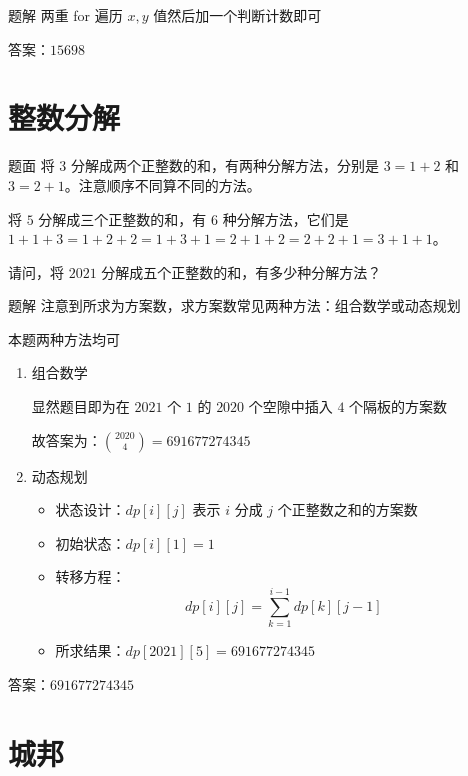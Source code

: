 \documentclass{pptt}
\begin{document}
\begin{frame}{题解}
    两重 for 遍历 $x,y$ 值然后加一个判断计数即可

    答案：$15698$
\end{frame}

\section{整数分解}

\begin{frame}{题面}
    将 $3$ 分解成两个正整数的和，有两种分解方法，分别是 $3=1+2$ 和 $3=2+1$。注意顺序不同算不同的方法。

    将 $5$ 分解成三个正整数的和，有 $6$ 种分解方法，它们是 $1+1+3 = 1+2+2 = 1+3+1 = 2+1+2 = 2+2+1 = 3+1+1$。

    请问，将 $2021$ 分解成五个正整数的和，有多少种分解方法？
\end{frame}

\begin{frame}{题解}
    注意到所求为方案数，求方案数常见两种方法：组合数学或动态规划

    本题两种方法均可

    \begin{enumerate}
        \item 组合数学

              显然题目即为在 $2021$ 个 $1$ 的 $2020$ 个空隙中插入 $4$ 个隔板的方案数

              故答案为：$\binom{2020}{4}=691677274345$
        \item 动态规划
              \begin{itemize}
                  \item 状态设计：$dp[i][j]$ 表示 $i$ 分成 $j$ 个正整数之和的方案数
                  \item 初始状态：$dp[i][1] = 1$
                  \item 转移方程：$$dp[i][j] = \sum_{k=1}^{i-1} dp[k][j-1]$$
                  \item 所求结果：$dp[2021][5] = 691677274345$
              \end{itemize}
    \end{enumerate}

    答案：$691677274345$
\end{frame}

\section{城邦}
\end{document}
